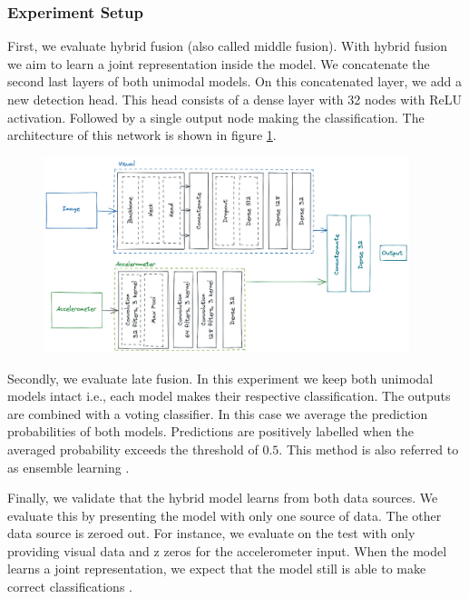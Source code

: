 \subsubsection{Experiment Setup}

First, we evaluate hybrid fusion (also called middle fusion). With hybrid fusion we aim to learn a joint representation inside the model. We concatenate the second last layers of both unimodal models. On this concatenated layer, we add a new detection head. This head consists of a dense layer with 32 nodes with ReLU activation. Followed by a single output node making the classification. The architecture of this network is shown in figure \ref{fig:multimodal-network}.

\begin{figure}[ht]
\begin{center}
\includegraphics[width=0.95\textwidth]{images/5_multimodal_fusion/hybrid-fusion.png}
\captionsetup{width=0.90\textwidth}
\label{fig:multimodal-network}
\end{center}
\end{figure}

Secondly, we evaluate late fusion. In this experiment we keep both unimodal models intact i.e., each model makes their respective classification. The outputs are combined with a voting classifier. In this case we average the prediction probabilities of both models. Predictions are positively labelled when the averaged probability exceeds the threshold of $0.5$. This method is also referred to as ensemble learning \cite{Baltrusaitis2017}.

Finally, we validate that the hybrid model learns from both data sources. We evaluate this by presenting the model with only one source of data. The other data source is zeroed out. For instance, we evaluate on the test with only providing visual data and z zeros for the accelerometer input. When the model learns a joint representation, we expect that the model still is able to make correct classifications \cite{Baltrusaitis2017}.

